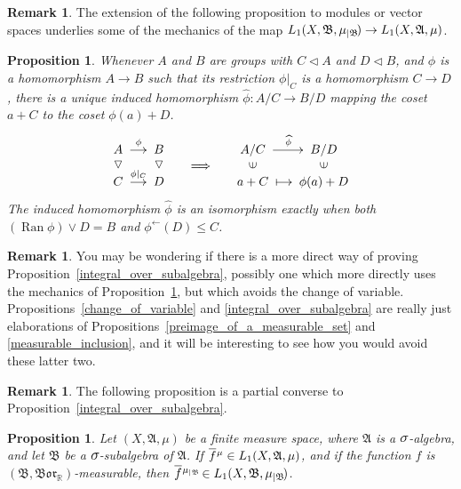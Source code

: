 \documentclass[
twoside=true,
paper=letter,
fontsize=11pt,
pagesize=auto,
leqno,
openany,
headsepline,
overfullrule,
]{scrbook}
\theoremstyle{plain}
\theoremstyle{plain}
\newtheorem{prop}[thm]{Proposition}
\theoremstyle{definition}
\newtheorem{rmk}[thm]{Remark}
\theoremstyle{bfnoteitalic}
\theoremstyle{bfnoteroman}
\newcommand{\sigalg}[1]{\mathfrak{#1}}
\newcommand{\normalin}{\vartriangleleft}
\newcommand{\normalup}{\rotatebox{90}{$\normalin$}}
\newcommand{\elementup}{\rotatebox{90}{$\in$}}
\DeclareMathOperator{\range}{Ran}
\newcommand{\borel}{\mathfrak{Bor}}
\newcommand{\textsigma}{\hbox{\large{$\sigma$}}\kern-1pt}
\newcommand{\restrictedto}[1]{_{\lvert#1}\kern-1.5pt}
\newcommand{\preimage}[1]{#1^{\leftarrow}}
\newcommand{\R}{\mathbb{R}}
\newcommand{\sigmaalgebra}{\sigalg{A}}
\newcommand{\sigmaalgebraii}{\sigalg{B}}
\newcommand{\measurespace}{X}
\newcommand{\measure}{\mu}
\newcommand*\xbar[1]{%
   \hbox{%
     \vbox{%
       \hrule height 0.4pt %
       \kern0.4ex%
       \hbox{%
         \ensuremath{#1}%
       }%
     }%
   }%
}
\newcommand{\lebclass}[1]{\hspace{.5pt}\xbar{#1}\hspace{0.5pt}}
\newcommand{\ellclass}[2]{\lebclass{#1}^{#2}}
\begin{document}
\begin{rmk}
The extension of the following proposition to modules or vector spaces underlies some of the mechanics of the map
$L_1(\measurespace, \sigmaalgebraii, \measure\restrictedto{\sigmaalgebraii})
\to
L_1(\measurespace, \sigmaalgebra, \measure)$.
\end{rmk}


\begin{prop}\label{induced_quotient_homomorphism}
Whenever $A$ and $B$ are groups with $C\normalin A$ and $D\normalin B$, and $\phi$ is a homomorphism ${A\to B}$ such that its restriction $\phi\vert_C$ is a homomorphism $C\to D$, there is a unique induced homomorphism ${\widehat \phi :A/C\to B/D}$ mapping the coset $a+C$ to the coset $\phi(a)+D$. 
\[
\xymatrix@R=-2pt@C=12pt{
\ A\  \ar[r]^{\phi} & \ B\  & & \ A/C\ \ar[r]^{\widehat \phi} & \ B/D\ \\
\normalup & \normalup & \Longrightarrow & \elementup & \elementup \\
\ C\ \ar[r]^{\phi\vert_C} & \ D\  & & \ a+C\ \ar@{|->}[r] & \ \phi(a)+D\ }
\]
The induced homomorphism $\widehat \phi$ is an isomorphism exactly when both  $(\range \phi) \vee D = B$ and $\preimage{\phi}(D)\leq C$. 
\end{prop}

\begin{rmk}
You may be wondering if there is a more direct way of proving Proposition~\ref{integral_over_subalgebra}, possibly one which more directly uses the mechanics of Proposition~\ref{induced_quotient_homomorphism}, but which avoids the change of variable.  
Propositions~\ref{change_of_variable} and \ref{integral_over_subalgebra} are really just elaborations of Propositions~\ref{preimage_of_a_measurable_set} and \ref{measurable_inclusion}, and it will be interesting to see how you would avoid these latter two.
\end{rmk}








\begin{rmk}
The following proposition is a partial converse to Proposition~\ref{integral_over_subalgebra}.
\end{rmk}


\begin{prop}\label{algebra_to_subalgebra}
Let $(\measurespace, \sigmaalgebra, \measure)$ be a finite measure space, where $\sigmaalgebra$ is a $\textsigma$-algebra, and let $\sigmaalgebraii$ be a $\textsigma$-subalgebra of $\sigmaalgebra$. 
If $\ellclass{f}{\measure} 
\in L_1(\measurespace, \sigmaalgebra, \measure)$, and if the function $f$ is $(\sigmaalgebraii, \borel_\R)$\hyp{}measurable, then
$\ellclass{f}{\measure\restrictedto{\sigmaalgebraii}}
\in L_1(\measurespace, \sigmaalgebraii, \measure\restrictedto{\sigmaalgebraii})$.
\end{prop}
\end{document}
